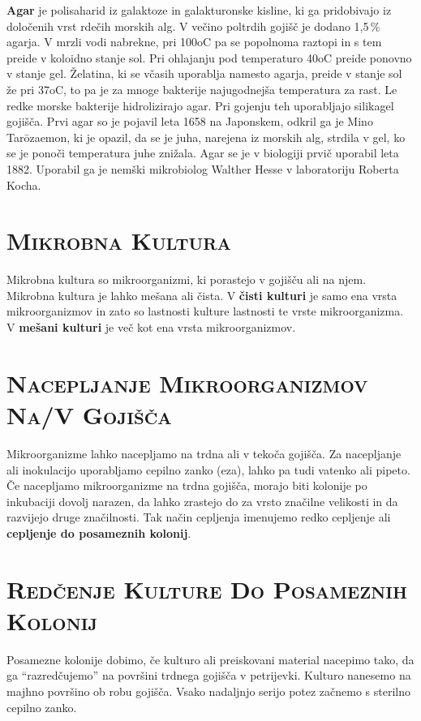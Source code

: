 \documentclass[12pt, a4paper, oneside]{report}
\begin{document}
\textbf{Agar} je polisaharid iz galaktoze in galakturonske kisline, ki ga pridobivajo iz določenih vrst rdečih morskih alg. V večino poltrdih gojišč je dodano 1,5\,\% agarja. V mrzli vodi nabrekne, pri 100oC pa se popolnoma raztopi in s tem preide v koloidno stanje sol. Pri ohlajanju pod temperaturo 40oC preide ponovno v stanje gel. Želatina, ki se včasih uporablja namesto agarja, preide v stanje sol že pri 37oC, to pa je za mnoge bakterije najugodnejša temperatura za rast. Le redke morske bakterije hidrolizirajo agar. Pri gojenju teh uporabljajo silikagel gojišča. Prvi agar so je pojavil leta 1658 na Japonskem, odkril ga je Mino Tarōzaemon, ki je opazil, da se je juha, narejena iz morskih alg, strdila v gel, ko se je ponoči temperatura juhe znižala. Agar se je v biologiji prvič uporabil leta 1882. Uporabil ga je nemški mikrobiolog Walther Hesse v laboratoriju Roberta Kocha.

\section{\textsc{Mikrobna Kultura}}

Mikrobna kultura so mikroorganizmi, ki porastejo v gojišču ali na njem. Mikrobna kultura je lahko mešana ali čista. V \textbf{čisti kulturi} je samo ena vrsta mikroorganizmov in zato so lastnosti kulture lastnosti te vrste mikroorganizma. V \textbf{mešani kulturi} je več kot ena vrsta mikroorganizmov.

\section{\textsc{Nacepljanje Mikroorganizmov Na/V Gojišča}}

Mikroorganizme lahko nacepljamo na trdna ali v tekoča gojišča. Za nacepljanje ali inokulacijo uporabljamo cepilno zanko (eza), lahko pa tudi vatenko ali pipeto. Če nacepljamo mikroorganizme na trdna gojišča, morajo biti kolonije po inkubaciji dovolj narazen, da lahko zrastejo do za vrsto značilne velikosti in da razvijejo druge značilnosti. Tak način cepljenja imenujemo redko cepljenje ali \textbf{cepljenje do posameznih kolonij}.

\section{\textsc{Redčenje Kulture Do Posameznih Kolonij}}

Posamezne kolonije dobimo, če kulturo ali preiskovani material nacepimo tako, da ga ``razredčujemo'' na površini trdnega gojišča v petrijevki. Kulturo nanesemo na majhno površino ob robu gojišča. Vsako nadaljnjo serijo potez začnemo s sterilno cepilno zanko.
\end{document}

